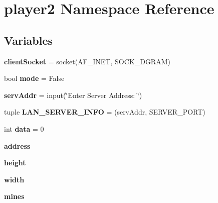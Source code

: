 \hypertarget{namespaceplayer2}{}\section{player2 Namespace Reference}
\label{namespaceplayer2}
\subsection*{Variables}
\begin{DoxyCompactItemize}
\item 
\mbox{\label{namespaceplayer2_ae5f64fc8f7b0b98b23d8ea60c1c6deaa}} 
{\bfseries client\+Socket} = socket(A\+F\+\_\+\+I\+N\+ET, S\+O\+C\+K\+\_\+\+D\+G\+R\+AM)
\item 
\mbox{\label{namespaceplayer2_a01deaf52d969f20b720b3cabce3ac31e}} 
bool {\bfseries mode} = False
\item 
\mbox{\label{namespaceplayer2_aadcd3911a13c6335dfde84f87701baf3}} 
{\bfseries serv\+Addr} = input(\char`\"{}Enter Server Address\+: \char`\"{})
\item 
\mbox{\label{namespaceplayer2_a9b9852c1f6f08b00a4db38b0d4bea7af}} 
tuple {\bfseries L\+A\+N\+\_\+\+S\+E\+R\+V\+E\+R\+\_\+\+I\+N\+FO} = (serv\+Addr, S\+E\+R\+V\+E\+R\+\_\+\+P\+O\+RT)
\item 
\mbox{\label{namespaceplayer2_a70135f2d915e69537aacd2ecca420a9e}} 
int {\bfseries data} = 0
\item 
\mbox{\label{namespaceplayer2_adb60efd98bad791213c17bc6602c7fec}} 
{\bfseries address}
\item 
\mbox{\label{namespaceplayer2_a2cf61b54bed5824e48868c19315ea58c}} 
{\bfseries height}
\item 
\mbox{\label{namespaceplayer2_ae56b0f965a4c5af6e38a7a547c03447c}} 
{\bfseries width}
\item 
\mbox{\label{namespaceplayer2_a93741307f314f9eb09e964944e05e728}} 
{\bfseries mines}
\item 
\mbox{\label{namespaceplayer2_ad170142e87f5109fa10893b3863dae6a}} 

\end{DoxyCompactItemize}
